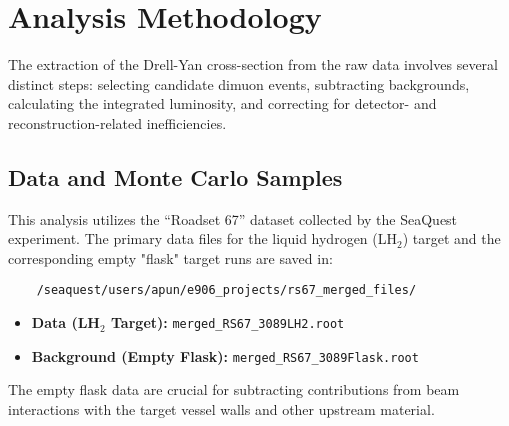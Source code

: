 \documentclass[11pt]{article}
\begin{document}
\section{Analysis Methodology}
\label{sec:methodology}
The extraction of the Drell-Yan cross-section from the raw data involves several distinct steps: selecting candidate dimuon events, subtracting backgrounds, calculating the integrated luminosity, and correcting for detector- and reconstruction-related inefficiencies.

\subsection{Data and Monte Carlo Samples}
This analysis utilizes the ``Roadset 67'' dataset collected by the SeaQuest experiment. The primary data files for the liquid hydrogen (LH$_2$) target and the corresponding empty "flask" target runs are saved in:
\begin{verbatim}
    /seaquest/users/apun/e906_projects/rs67_merged_files/
\end{verbatim}
\begin{itemize}
    \item \textbf{Data (LH$_2$ Target):} \texttt{merged\_RS67\_3089LH2.root}
    \item \textbf{Background (Empty Flask):} \texttt{merged\_RS67\_3089Flask.root}
\end{itemize}
The empty flask data are crucial for subtracting contributions from beam interactions with the target vessel walls and other upstream material.
\end{document}
